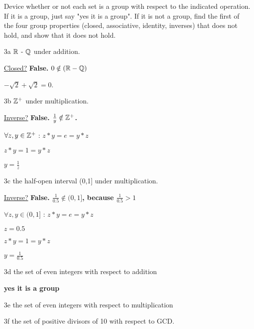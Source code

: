 \begin{question}{3}
Device whether or not each set is a group with respect to the indicated operation. If it is a group, just say "yes it is a group". If it is not a group, find the first of the four group properties (closed, associative, identity, inverses) that does not hold, and show that it does not hold.
\end{question}

\begin{question}{3a}
$\mathbb{R}$ - $\mathbb{Q}$ under addition.
\end{question}

\underline{Closed?} \textbf{False. $0 \notin (\mathbb{R}-\mathbb{Q})$}

$-\sqrt{2} + \sqrt{2} = 0$. 


\begin{question}{3b}
$\mathbb{Z}^+$ under multiplication.
\end{question}

\underline{Inverse?} \textbf{False. $\frac{1}{y} \notin \mathbb{Z}^+$.}

$\forall z,y \in \mathbb{Z}^+$ : $z * y = e = y * z$

$z * y = 1 = y * z$

$y = \frac{1}{z}$


\begin{question}{3c}
the half-open interval (0,1] under multiplication.
\end{question}

\underline{Inverse?} \textbf{False. $\frac{1}{0.5} \notin (0,1]$, because $\frac{1}{0.5} > 1$}

$\forall z,y \in (0,1]$ : $z * y = e = y * z$

$z=0.5$

$z * y = 1 = y * z$

$y = \frac{1}{0.5}$


\begin{question}{3d}
the set of even integers with respect to addition
\end{question}

\textbf{yes it is a group}

\begin{question}{3e}
the set of even integers with respect to multiplication
\end{question}


\begin{question}{3f}
the set of positive divisors of 10 with respect to GCD.
\end{question}


